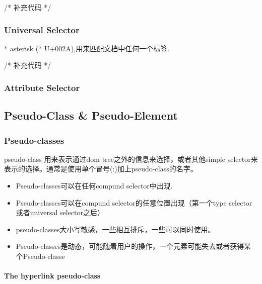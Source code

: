 \begin{CSS}

/* 补充代码 */

\end{CSS}


\subsubsection{Universal Selector}

* asterisk (* U+002A),用来匹配文档中任何一个标签.


\begin{CSS}

/* 补充代码 */

\end{CSS}

\subsubsection{Attribute Selector}



\subsection{Pseudo-Class \& Pseudo-Element}

\subsubsection{Pseudo-classes}

pseudo-class 用来表示通过dom tree之外的信息来选择，或者其他simple selector来表示的选择。通常是使用单个冒号(:)加上pseudo-class的名字。


\begin{itemize}
\item Pseudo-classes可以在任何compund selector中出现. 
\item Pseudo-classes可以在compund selector的任意位置出现（第一个type selector或者universal selector之后）
\item pseudo-classes大小写敏感，一些相互排斥，一些可以同时使用。
\item Pseudo-classes是动态，可能随着用户的操作，一个元素可能失去或者获得某个Pseudo-classe
\end{itemize}

\paragraph{The hyperlink pseudo-class}

